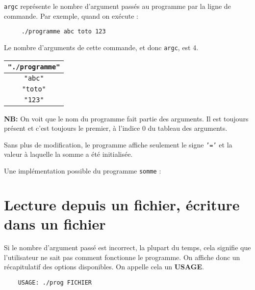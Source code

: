 \documentclass[10pt]{article}
\begin{document}
\begin{enumerate}[label=\textbf{[\alph*]}]
  \setlength\itemsep{1em}

\item \texttt{argc} représente le nombre d'argument passés au
  programme par la ligne de commande. Par exemple, quand on exécute :

\begin{verbatim}
     ./programme abc toto 123
\end{verbatim}

  Le nombre d'arguments de cette commande, et donc \texttt{argc}, est 4.

  \begin{center}
    \begin{tabular}{|c|}
      \hline
      \texttt{"./programme"} \\
      \hline
      \texttt{"abc"} \\
      \hline
      \texttt{"toto"} \\
      \hline
      \texttt{"123"} \\
      \hline
    \end{tabular}
  \end{center}

\textbf{NB:} On voit que le nom du programme fait partie des
arguments. Il est toujours présent et c'est toujours le premier, à
l'indice 0 du tableau des arguments.

\item Sans plus de modification, le programme affiche seulement le
  signe \texttt{'='} et la valeur à laquelle la somme a été
  initialisée.

\item Une implémentation possible du programme \texttt{somme} :

  \vspace{0.5cm}
  

  \newpage
  \section{Lecture depuis un fichier, écriture dans un fichier}

\item Si le nombre d'argument passé est incorrect, la plupart du
  temps, cela signifie que l'utilisateur ne sait pas comment
  fonctionne le programme. On affiche donc un récapitulatif des
  options disponibles. On appelle cela un \textbf{USAGE}.

\begin{verbatim}
    USAGE: ./prog FICHIER
\end{verbatim}


\end{enumerate}
\end{document}
